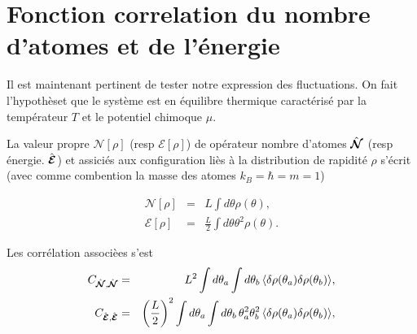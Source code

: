 







\section{Fonction correlation du nombre d'atomes et de l'énergie}


Il est maintenant pertinent de tester notre expression des fluctuations. On fait l'hypothèset que le système est en équilibre thermique caractérisé par la températeur $T$ et le potentiel chimoque $\mu$.

La valeur propre $\mathcal{N}[\rho]$ (resp $\mathcal{E}[\rho]$) de opérateur nombre d'atomes $\hat{\bm{\mathcal{N}}}$ (resp énergie. $\hat{\bm{\mathcal{E}}}$) et assiciés aux configuration liès à la distribution de rapidité $\rho$ s'écrit (avec comme combention la masse des atomes $k_B = \hbar = m =1$)

\begin{eqnarray*}
	\mathcal{N}[\rho] & = & L \int d \theta \rho(\theta),\\
	\mathcal{E}[\rho] & = & 	\frac{L}2 \int d \theta  \theta^2 \rho(\theta).	
\end{eqnarray*}

Les corrélation associèes s'est 
\begin{eqnarray*}
	C_{\hat{\bm{\mathcal{N}}},\hat{\bm{\mathcal{N}}}} & = &  L^2 \int d\theta_a \int d\theta_b \, \langle \delta \rho(\theta_a) \delta \rho(\theta_b) \rangle, \\
	C_{\hat{\bm{\mathcal{E}}},\hat{\bm{\mathcal{E}}}} & = &  	\left(\frac{L}2\right)^2 \int d\theta_a \int d\theta_b \,  \theta_a^2 \theta_b^2 \, \langle \delta \rho(\theta_a) \delta \rho(\theta_b) \rangle, \\	
\end{eqnarray*}



